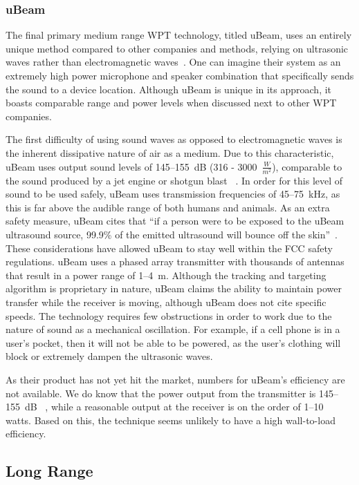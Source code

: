 \subsubsection{uBeam}
The final primary medium range WPT technology, titled uBeam, uses an entirely unique method compared to other companies and methods, relying on ultrasonic waves rather than electromagnetic waves~\cite{constine_ubeam_2015}. One can imagine their system as an extremely high power microphone and speaker combination that specifically sends the sound to a device location. Although uBeam is unique in its approach, it boasts comparable range and power levels when discussed next to other WPT companies.

The first difficulty of using sound waves as opposed  to electromagnetic waves is the inherent dissipative nature of air as a medium. Due to this characteristic, uBeam uses output sound levels of \numrange{145}{155}~dB (316 - 3000~$\frac{W}{m^2}$), comparable to the sound produced by a jet engine or shotgun blast ~\cite{galencarolaudio207}. In order for this level of sound to be used safely, uBeam uses transmission frequencies of \numrange{45}{75}~kHz, as this is far above the audible range of both humans and animals. As an extra safety measure, uBeam cites that ``if a person were to be exposed to the uBeam ultrasound source, 99.9\% of the emitted ultrasound will bounce off the skin''~\cite{constine_ubeam_2015}. These considerations have allowed uBeam to stay well within the FCC safety regulations.
uBeam uses a phased array transmitter with thousands of antennas that result in a power range of \numrange{1}{4}~m. Although the tracking and targeting algorithm is proprietary in nature, uBeam claims the ability to maintain power transfer while the receiver is moving, although uBeam does not cite specific speeds. The technology requires few obstructions in order to work due to the nature of sound as a mechanical oscillation. For example, if a cell phone is in a user's pocket, then it will not be able to be powered, as the user's clothing will block or extremely dampen the ultrasonic waves.

As their product has not yet hit the market, numbers for uBeam's efficiency are not available. We do know that the power output from the transmitter is \numrange{145}{155}~dB ~\cite{constine_ubeam_2015}, while a reasonable output at the receiver is on the order of \numrange{1}{10}~ watts. Based on this, the technique seems unlikely to have a high wall-to-load efficiency.

\subsection{Long Range}

